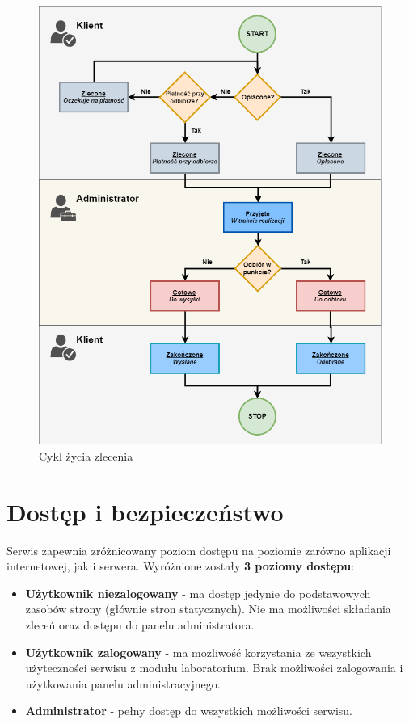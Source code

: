 	\begin{figure}[ht]
    	\centering
    	\includegraphics[width=0.9\linewidth]{graphics/chapter-4/order-states.png}
    	\caption{Cykl życia zlecenia}
    	\label{fig:order-states}
    \end{figure}
	
	\section{Dostęp i bezpieczeństwo}
	
\quad Serwis zapewnia zróżnicowany poziom dostępu na poziomie zarówno aplikacji internetowej, jak i serwera. Wyróżnione zostały \textbf{3 poziomy dostępu}:
	\begin{itemize}
	    \item \textbf{Użytkownik niezalogowany} - ma dostęp jedynie do podstawowych zasobów strony (głównie stron statycznych). Nie ma możliwości składania zleceń oraz dostępu do panelu administratora.
	    \item \textbf{Użytkownik zalogowany} - ma możliwość korzystania ze wszystkich użyteczności serwisu z modułu laboratorium. Brak możliwości zalogowania i użytkowania panelu administracyjnego.
	    \item \textbf{Administrator} - pełny dostęp do wszystkich możliwości serwisu.
	\end{itemize}
	
